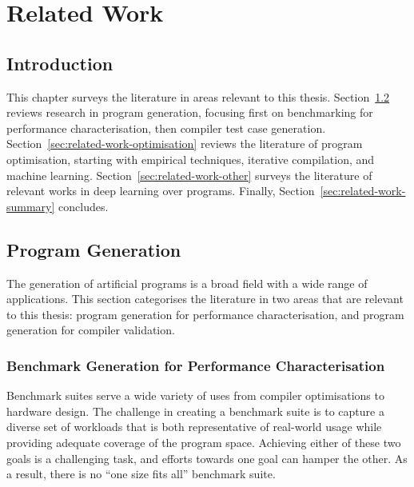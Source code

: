 \chapter{Related Work}
\label{chap:related-work}

\section{Introduction}

This chapter surveys the literature in areas relevant to this thesis. Section~\ref{sec:related-work-generation} reviews research in program generation, focusing first on benchmarking for performance characterisation, then compiler test case generation. Section~\ref{sec:related-work-optimisation} reviews the literature of program optimisation, starting with empirical techniques, iterative compilation, and machine learning. Section~\ref{sec:related-work-other} surveys the literature of relevant works in deep learning over programs. Finally, Section~\ref{sec:related-work-summary} concludes.


\section{Program Generation}
\label{sec:related-work-generation}

The generation of artificial programs is a broad field with a wide range of applications. This section categorises the literature in two areas that are relevant to this thesis: program generation for performance characterisation, and program generation for compiler validation.

\subsection{Benchmark Generation for Performance Characterisation}

Benchmark suites serve a wide variety of uses from compiler optimisations to hardware design. The challenge in creating a benchmark suite is to capture a diverse set of workloads that is both representative of real-world usage while providing adequate coverage of the program space. Achieving either of these two goals is a challenging task, and efforts towards one goal can hamper the other. As a result, there is no ``one size fits all'' benchmark suite.

